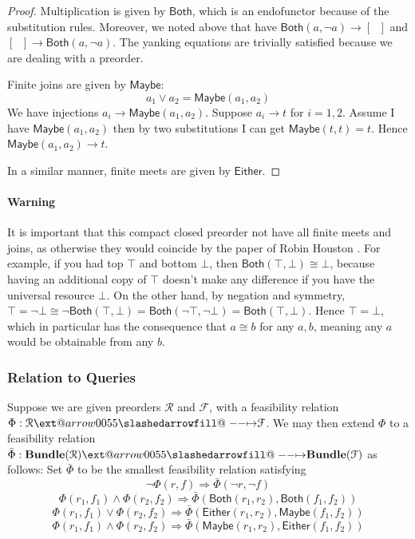 \documentclass[12pt]{article}
\makeatletter
\theoremstyle{definition}
\theoremstyle{plain}
\theoremstyle{plain}
\theoremstyle{plain}
\theoremstyle{plain}
\theoremstyle{remark}
\theoremstyle{remark}
\newcommand{\mc}[1]{\mathcal{#1}}
\def\slashedarrowfill@#1#2#3#4#5{%
	$\m@th\thickmuskip0mu\medmuskip\thickmuskip\thinmuskip\thickmuskip
	\relax#5#1\mkern-7mu%
	\cleaders\hbox{$#5\mkern-2mu#2\mkern-2mu$}\hfill
	\mathclap{#3}\mathclap{#2}%
	\cleaders\hbox{$#5\mkern-2mu#2\mkern-2mu$}\hfill
	\mkern-7mu#4$%
}
\def\rightslashedarrowfill@{%
	\slashedarrowfill@\relbar\relbar\mapstochar\rightarrow}
\newcommand\xslashedrightarrow[2][]{%
	\ext@arrow 0055{\rightslashedarrowfill@}{#1}{#2}}
\makeatother
\begin{document}
\begin{proof} Multiplication is given by $\mathsf{Both}$, which is an endofunctor because of the substitution rules. Moreover, we noted above that have $\mathsf{Both}(a, \neg a) \rightarrow [ \phantom{n}]$ and $[ \phantom{n}] \rightarrow \mathsf{Both}(a, \neg a)$. The yanking equations are trivially satisfied because we are dealing with a preorder. 

Finite joins are given by $\mathsf{Maybe}$:
\[a_1 \vee a_2 = \mathsf{Maybe}(a_1,a_2)\]
We have injections $a_i \rightarrow \mathsf{Maybe}(a_1,a_2)$. Suppose $a_i \rightarrow t$ for $i=1,2$. Assume I have $\mathsf{Maybe}(a_1,a_2)$ then by two substitutions I can get $\mathsf{Maybe}(t,t) = t$. Hence $\mathsf{Maybe}(a_1,a_2) \rightarrow t$.

In a similar manner, finite meets are given by $\mathsf{Either}$.
\end{proof}

\paragraph{Warning} It is important that this compact closed preorder not have all finite meets and joins, as otherwise they would coincide by the paper of Robin Houston \cite{Houston2006}.  For example, if you had top $\top$ and bottom $\bot$, then $\mathsf{Both}(\top,\bot) \cong \bot$, because having an additional copy of $\top$ doesn't make any difference if you have the universal resource $\bot$. On the other hand, by negation and symmetry, $\top = \neg \bot \cong \neg \mathsf{Both}(\top,\bot) = \mathsf{Both}(\neg \top, \neg \bot) = \mathsf{Both}(\top,\bot)$. Hence $\top = \bot$, which in particular has the consequence that $a \cong b$ for any $a,b$, meaning any $a$ would be obtainable from any $b$. 


\subsubsection{Relation to Queries}
Suppose we are given preorders $\mc{R}$ and $\mc{F}$, with a feasibility relation $\Phi: \mc{R} \xslashedrightarrow{} \mc{F}$. We may then extend $\Phi$ to a feasibility relation $\bar\Phi: \mathbf{Bundle}(\mc{R}) \xslashedrightarrow{} \mathbf{Bundle}(\mc{F})$ as follows: Set $\bar\Phi$ to be the smallest feasibility relation satisfying
$$\neg \Phi(r,f) \Rightarrow \bar\Phi(\neg r,\neg f)$$
$$\Phi(r_1,f_1) \wedge \Phi(r_2,f_2) \Rightarrow \bar\Phi(\mathsf{Both}(r_1,r_2),\mathsf{Both}(f_1,f_2)) $$
$$\Phi(r_1,f_1) \vee \Phi(r_2,f_2) \Rightarrow \bar\Phi(\mathsf{Either}(r_1,r_2),\mathsf{Maybe}(f_1,f_2)) $$
$$\Phi(r_1,f_1) \wedge \Phi(r_2,f_2) \Rightarrow \bar\Phi(\mathsf{Maybe}(r_1,r_2),\mathsf{Either}(f_1,f_2)) $$
\end{document}
